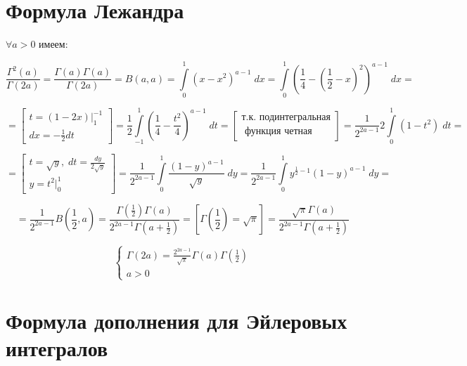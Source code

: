 \documentclass[../../main.tex]{subfiles}
\begin{document}
	\section{Формула Лежандра}
	
	$\forall a > 0$ имеем:
	
	\[ \frac{\Gamma^2(a)}{\Gamma(2a)} = \frac{\Gamma(a) \Gamma(a)}{\Gamma(2a)} = B(a,a) = \int\limits_{0}^{1} \left(x-x^2 \right) ^{a-1} \; dx = \int\limits_{0}^{1} \left(\frac{1}{4} - \left( \frac{1}{2} - x\right)^2  \right) ^{a-1} \; dx =  \]
	
	\[  =  \left[  \begin{gathered}
	t = (1-2x) \bigg|_{1}^{-1} \\
	dx = -\frac{1}{2} dt 
	\end{gathered}   \right] = \frac{1}{2}  \int\limits_{-1}^{1} \left( \frac{1}{4} - \frac{t^2}{4}  \right)^{a-1} \; dt =\left[ 
	\begin{gathered}
	\text{т.к. подинтегральная} \\
	\text{ функция четная}
	\end{gathered}	\right] = \frac{1}{2^{2a-1}}  2 \int\limits_{0}^{1} \left( 1-t^2  \right)  \; dt =     \] 
	
	\[  =  \left[  \begin{gathered}
	t = \sqrt{y}, \; dt = \frac{dy}{2\sqrt{y}} \\
	y = t^2  \bigg|_{0}^{1}
	\end{gathered}   \right] =  \frac{1}{2^{2a-1}} \int\limits_{0}^{1} \frac{(1-y)^{a-1}}{\sqrt{y}} \; dy  = \frac{1}{2^{2a-1}} \int\limits_{0}^{1} y^{\frac{1}{2} - 1}(1-y)^{a-1} \; dy  =     \]
	
	\[  = \frac{1}{2^{2a-1}} B\left( \frac{1}{2},a \right) = \frac{\Gamma\left( \frac{1}{2} \right) \Gamma(a) }{2^{2a-1} \Gamma\left( a + \frac{1}{2} \right)} = \left[ \Gamma\left( \frac{1}{2} \right) = \sqrt{\pi}  \right] = \frac{\sqrt{\pi} \Gamma(a) }{2^{2a-1} \Gamma\left( a + \frac{1}{2} \right)}    \]
	
	\begin{equation}
	\label{14:13}
	\begin{cases}
		\Gamma(2a) = \frac{2^{2a-1}}{\sqrt{\pi}} \Gamma(a) \Gamma\left( \frac{1}{2} \right) \\
		a > 0
	\end{cases}
	\end{equation}
	
	\section{Формула дополнения для Эйлеровых интегралов}
	
\end{document}
